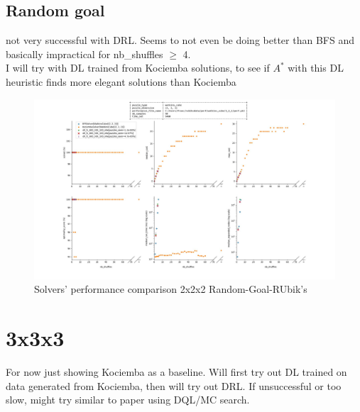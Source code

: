 \subsection{Random goal}

not very successful with DRL. Seems to not even be doing better than BFS and basically impractical for nb\_shuffles $\geq$ 4.
\\
I will try with DL trained from Kociemba solutions, to see if $A^{*}$ with this DL heuristic finds more elegant solutions than Kociemba

\begin{landscape}
\centering\vspace*{\fill}
\begin{figure}[H]
\centering
\includegraphics[scale=0.50]{./Figures/222WCPerformance.jpeg}
\caption[222RCPerformance]{Solvers' performance comparison 2x2x2 Random-Goal-RUbik's}
\label{fig:222WCPerformance}
\end{figure}
\vfill
\end{landscape}
\restoregeometry

\section{3x3x3}

For now just showing Kociemba as a baseline. Will first try out DL trained on data generated from Kociemba, then will try out DRL. If unsuccessful or too slow, might try similar to paper using DQL/MC search.

